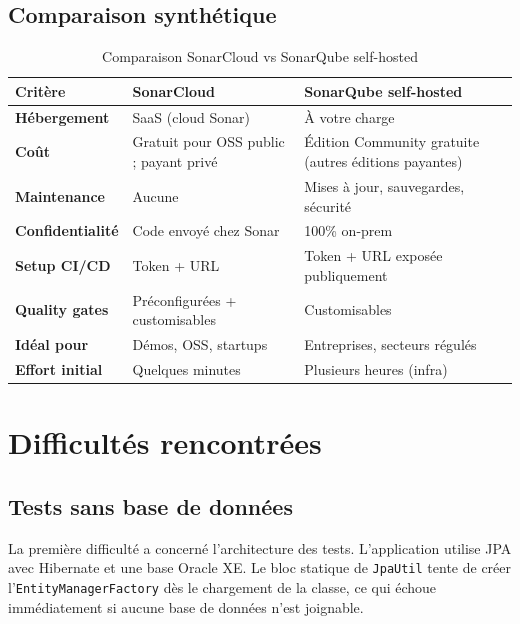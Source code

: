 \documentclass[12pt,a4paper]{report}
\begin{document}
\section{Comparaison synthétique}

\begin{table}[h!]
\centering
\small
\renewcommand{\arraystretch}{1.4}
\begin{tabular}{>{\bfseries}p{3.5cm} p{4.5cm} p{4.5cm}}
\toprule
Critère & SonarCloud & SonarQube self-hosted \\
\midrule
Hébergement              & SaaS (cloud Sonar) & À votre charge \\
Coût                     & Gratuit pour OSS public ; payant privé & Édition Community gratuite (autres éditions payantes) \\
Maintenance              & Aucune & Mises à jour, sauvegardes, sécurité \\
Confidentialité          & Code envoyé chez Sonar & 100\% on-prem \\
Setup CI/CD              & Token + URL & Token + URL exposée publiquement \\
Quality gates            & Préconfigurées + customisables & Customisables \\
Idéal pour               & Démos, OSS, startups & Entreprises, secteurs régulés \\
Effort initial           & Quelques minutes & Plusieurs heures (infra) \\
\bottomrule
\end{tabular}
\caption{Comparaison SonarCloud vs SonarQube self-hosted}
\label{tab:sonar-comparison}
\end{table}

\chapter{Difficultés rencontrées}
\label{ch:diff}

\section{Tests sans base de données}

La première difficulté a concerné l'architecture des tests. L'application
utilise JPA avec Hibernate et une base Oracle XE. Le bloc statique de
\texttt{JpaUtil} tente de créer l'\texttt{EntityManagerFactory} dès le
chargement de la classe, ce qui échoue immédiatement si aucune base de données
n'est joignable.
\end{document}
